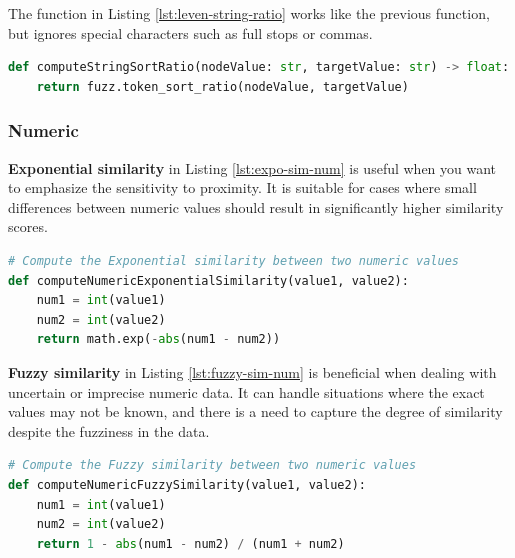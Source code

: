     
    The function in Listing \ref{lst:leven-string-ratio} works like the previous function, but ignores special characters such as full stops or commas.\\
    
\begin{lstlisting}[language=Python, caption=Levenstein distance between two strings without considering special characters, label={lst:leven-string-ratio}]
def computeStringSortRatio(nodeValue: str, targetValue: str) -> float:
    return fuzz.token_sort_ratio(nodeValue, targetValue)
\end{lstlisting}





    \subsubsection{Numeric}
    
    \textbf{Exponential similarity} in Listing \ref{lst:expo-sim-num} is useful when you want to emphasize the sensitivity to proximity. It is suitable for cases where small differences between numeric values should result in significantly higher similarity scores.\\
    
\begin{lstlisting}[language=Python, caption=Function to compute the similarity value between two attributes, label={lst:expo-sim-num}]
# Compute the Exponential similarity between two numeric values
def computeNumericExponentialSimilarity(value1, value2):
    num1 = int(value1)
    num2 = int(value2)
    return math.exp(-abs(num1 - num2))
\end{lstlisting}
    
    
    \textbf{Fuzzy similarity} in Listing \ref{lst:fuzzy-sim-num} is beneficial when dealing with uncertain or imprecise numeric data. It can handle situations where the exact values may not be known, and there is a need to capture the degree of similarity despite the fuzziness in the data.\\
\begin{lstlisting}[language=Python, caption=Function to compute the similarity value between two attributes, label={lst:fuzzy-sim-num}]
# Compute the Fuzzy similarity between two numeric values
def computeNumericFuzzySimilarity(value1, value2):
    num1 = int(value1)
    num2 = int(value2)
    return 1 - abs(num1 - num2) / (num1 + num2)
\end{lstlisting}

